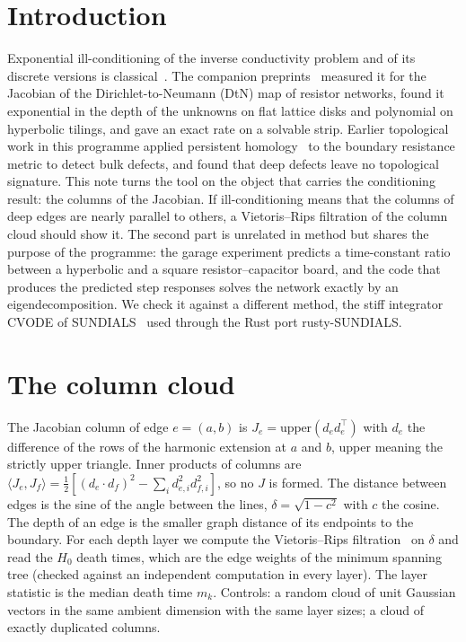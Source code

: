 \documentclass[11pt,a4paper]{article}
\begin{document}
\section{Introduction}
Exponential ill-conditioning of the inverse conductivity problem and of its discrete versions is classical~\cite{DiCristoRondi,BorceaReview}. The companion preprints~\cite{Preprint,StripPaper} measured it for the Jacobian of the Dirichlet-to-Neumann (DtN) map of resistor networks,
found it exponential in the depth of the unknowns on flat lattice disks and polynomial on hyperbolic tilings, and gave an exact rate on a solvable strip. Earlier topological work in this programme applied persistent homology~\cite{ELZ} to the boundary resistance metric to detect bulk defects,
and found that deep defects leave no topological signature. This note turns the tool on the object that carries the conditioning result: the columns of the Jacobian. If ill-conditioning means that the columns of deep edges are nearly parallel to others,
a Vietoris--Rips filtration of the column cloud should show it. The second part is unrelated in method but shares the purpose of the programme: the garage experiment predicts a time-constant ratio between a hyperbolic and a square resistor--capacitor board, and the code that
produces the predicted step responses solves the network exactly by an eigendecomposition. We check it against a different method, the stiff integrator CVODE of SUNDIALS~\cite{SUNDIALS} used through the Rust port rusty-SUNDIALS.

\section{The column cloud}\label{sec:cloud}
The Jacobian column of edge $e=(a,b)$ is $J_e=\mathrm{upper}(d_ed_e^{\top})$ with $d_e$ the difference of the rows of the harmonic extension at $a$ and $b$, upper meaning the strictly upper triangle. Inner products of columns are
$\langle J_e,J_f\rangle=\tfrac12[(d_e\!\cdot\! d_f)^2-\sum_i d_{e,i}^2d_{f,i}^2]$, so no $J$ is formed. The distance between edges is the sine of the angle between the lines, $\delta=\sqrt{1-c^2}$ with $c$ the cosine. The depth of an edge is the smaller graph distance
of its endpoints to the boundary. For each depth layer we compute the Vietoris--Rips filtration~\cite{GUDHI} on $\delta$ and read the $H_0$ death times, which are the edge weights of the minimum spanning tree (checked against an independent computation in every layer).
The layer statistic is the median death time $m_k$. Controls: a random cloud of unit Gaussian vectors in the same ambient dimension with the same layer sizes; a cloud of exactly duplicated columns.
\end{document}
